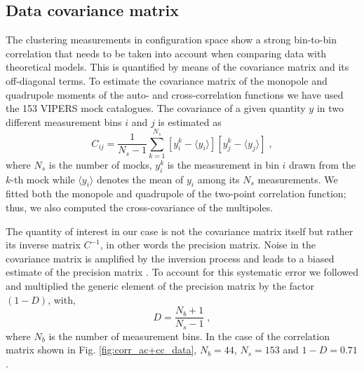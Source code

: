 \documentclass[longauth]{aa}
\def\({\left(}
\def\){\right)}
\def\[{\left[}
\def\]{\right]}
\begin{document}
\subsection{Data covariance matrix}

The clustering measurements in configuration space show a strong bin-to-bin correlation that needs to be taken into account when comparing data with theoretical models. This is quantified by means of the covariance matrix and its off-diagonal terms. To estimate the covariance matrix of the monopole and quadrupole moments of the auto- and cross-correlation functions we have used the 153 VIPERS mock catalogues. The covariance of a given quantity $y$ in two different measurement bins $i$ and $j$ is estimated as
	\begin{equation}
		C_{ij} = \frac{1}{N_s-1}\sum_{k=1}^{N_s}\[y_i^k-\langle y_i\rangle\]\[y_j^k-\langle y_j\rangle\]\; ,																\label{eq:cov}	
	\end{equation}
where $N_s$ is the number of mocks, $y_i^k$ is the measurement in bin $i$ drawn from the $k$-th mock while $\langle y_i\rangle$ denotes the mean of $y_i$ among its $N_s$ measurements. We fitted both the monopole and quadrupole of the two-point correlation function; thus, we also computed the cross-covariance of the multipoles.

The quantity of interest in our case is not the covariance matrix itself but rather its inverse matrix $C^{-1}$, in other words the precision matrix. Noise in the covariance matrix is amplified by the inversion process and leads to a biased estimate of the precision matrix \citep{hartlap07}. To account for this systematic error we followed \citet{percival14} and multiplied the generic element of the precision matrix by the factor $\(1-D\)$, with,
	\begin{equation}
		D = \frac{N_b+1}{N_s-1}\; ,																				\label{eq:cov1}
	\end{equation}
where $N_b$ is the number of measurement bins.  In the case of the correlation matrix shown in Fig. \ref{fig:corr_ac+cc_data}, $N_b=44$, $N_s=153$ and $1-D=0.71$.
\end{document}
